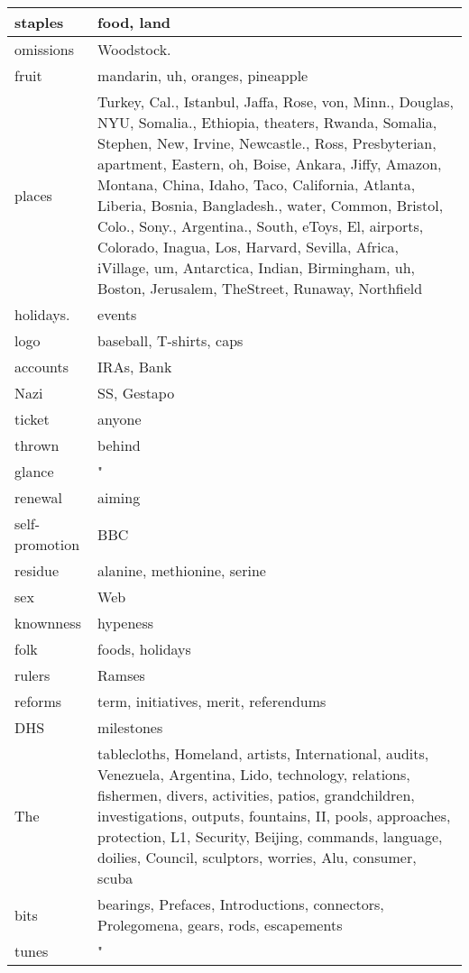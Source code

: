 \begin{longtable}{|l|p{11cm}|}
  \hline
  staples & food, land \\
  \hline
  omissions & Woodstock. \\
  \hline
  fruit & mandarin, uh, oranges, pineapple \\
  \hline
  places & Turkey, Cal., Istanbul, Jaffa, Rose, von, Minn., Douglas, NYU, Somalia., Ethiopia, theaters, Rwanda, Somalia, Stephen, New, Irvine, Newcastle., Ross, Presbyterian, apartment, Eastern, oh, Boise, Ankara, Jiffy, Amazon, Montana, China, Idaho, Taco, California, Atlanta, Liberia, Bosnia, Bangladesh., water, Common, Bristol, Colo., Sony., Argentina., South, eToys, El, airports, Colorado, Inagua, Los, Harvard, Sevilla, Africa, iVillage, um, Antarctica, Indian, Birmingham, uh, Boston, Jerusalem, TheStreet, Runaway, Northfield \\
  \hline
  holidays. & events \\
  \hline
  logo & baseball, T-shirts, caps \\
  \hline
  accounts & IRAs, Bank \\
  \hline
  Nazi & SS, Gestapo \\
  \hline
  ticket & anyone \\
  \hline
  thrown & behind \\
  \hline
  glance & " \\
  \hline
  renewal & aiming \\
  \hline
  self-promotion & BBC \\
  \hline
  residue & alanine, methionine, serine \\
  \hline
  sex & Web \\
  \hline
  knownness & hypeness \\
  \hline
  folk & foods, holidays \\
  \hline
  rulers & Ramses \\
  \hline
  reforms & term, initiatives, merit, referendums \\
  \hline
  DHS & milestones \\
  \hline
  The & tablecloths, Homeland, artists, International, audits, Venezuela, Argentina, Lido, technology, relations, fishermen, divers, activities, patios, grandchildren, investigations, outputs, fountains, II, pools, approaches, protection, L1, Security, Beijing, commands, language, doilies, Council, sculptors, worries, Alu, consumer, scuba \\
  \hline
  bits & bearings, Prefaces, Introductions, connectors, Prolegomena, gears, rods, escapements \\
  \hline
  tunes & " \\

\end{longtable}
